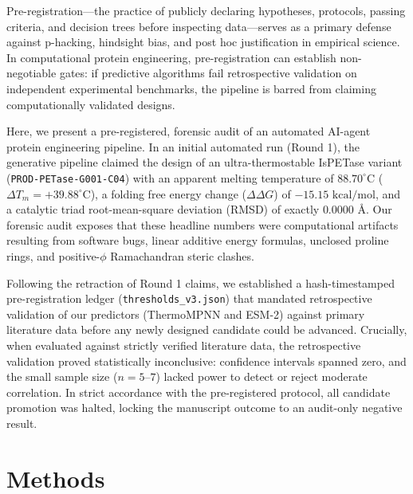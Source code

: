 \documentclass[11pt,a4paper]{article}
\begin{document}
Pre-registration---the practice of publicly declaring hypotheses, protocols, passing criteria, and decision trees before inspecting data---serves as a primary defense against p-hacking, hindsight bias, and post hoc justification in empirical science. In computational protein engineering, pre-registration can establish non-negotiable gates: if predictive algorithms fail retrospective validation on independent experimental benchmarks, the pipeline is barred from claiming computationally validated designs.

Here, we present a pre-registered, forensic audit of an automated AI-agent protein engineering pipeline. In an initial automated run (Round 1), the generative pipeline claimed the design of an ultra-thermostable IsPETase variant (\texttt{PROD-PETase-G001-C04}) with an apparent melting temperature of $88.70^\circ\text{C}$ ($\Delta T_m = +39.88^\circ\text{C}$), a folding free energy change ($\Delta\Delta G$) of $-15.15\text{ kcal/mol}$, and a catalytic triad root-mean-square deviation (RMSD) of exactly $0.0000\text{ \AA}$. Our forensic audit exposes that these headline numbers were computational artifacts resulting from software bugs, linear additive energy formulas, unclosed proline rings, and positive-$\phi$ Ramachandran steric clashes. 

Following the retraction of Round 1 claims, we established a hash-timestamped pre-registration ledger (\texttt{thresholds\_v3.json}) that mandated retrospective validation of our predictors (ThermoMPNN and ESM-2) against primary literature data before any newly designed candidate could be advanced. Crucially, when evaluated against strictly verified literature data, the retrospective validation proved statistically inconclusive: confidence intervals spanned zero, and the small sample size ($n=5\text{--}7$) lacked power to detect or reject moderate correlation. In strict accordance with the pre-registered protocol, all candidate promotion was halted, locking the manuscript outcome to an audit-only negative result.

\section{Methods}
\end{document}
